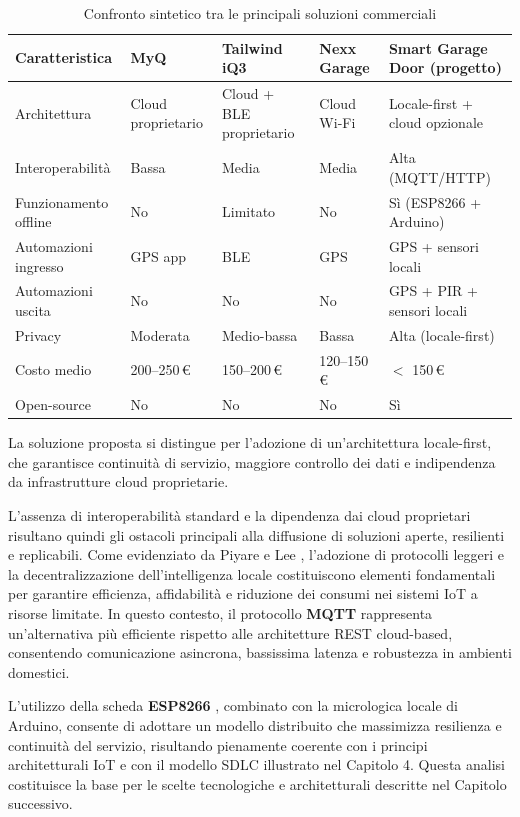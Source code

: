 \begin{table}[H]
\centering
\caption{Confronto sintetico tra le principali soluzioni commerciali}
\label{tab:competitors}
\begin{tabularx}{\textwidth}{@{}lXXXX@{}}
\toprule
\textbf{Caratteristica} & \textbf{MyQ} & \textbf{Tailwind iQ3} & \textbf{Nexx Garage} & \textbf{Smart Garage Door (progetto)} \\
\midrule
Architettura & Cloud proprietario & Cloud + BLE proprietario & Cloud Wi-Fi & Locale-first + cloud opzionale \\
Interoperabilità & Bassa & Media & Media & Alta (MQTT/HTTP) \\
Funzionamento offline & No & Limitato & No & Sì (ESP8266 + Arduino) \\
Automazioni ingresso & GPS app & BLE & GPS & GPS + sensori locali \\
Automazioni uscita & No & No & No & GPS + PIR + sensori locali \\
Privacy & Moderata & Medio-bassa & Bassa & Alta (locale-first) \\
Costo medio & 200–250\,€ & 150–200\,€ & 120–150\,€ & $<$ 150\,€ \\
Open-source & No & No & No & Sì \\
\bottomrule
\end{tabularx}
\end{table}

La soluzione proposta si distingue per l’adozione di un’architettura locale-first,
che garantisce continuità di servizio, maggiore controllo dei dati e indipendenza
da infrastrutture cloud proprietarie.

L’assenza di interoperabilità standard e la dipendenza dai cloud proprietari risultano quindi gli ostacoli principali alla diffusione di soluzioni aperte, resilienti e replicabili. Come evidenziato da Piyare e Lee \cite{Piyare2013}, l’adozione di protocolli leggeri e la decentralizzazione dell’intelligenza locale costituiscono elementi fondamentali per garantire efficienza, affidabilità e riduzione dei consumi nei sistemi IoT a risorse limitate. In questo contesto, il protocollo \textbf{MQTT} \cite{MQTTspec} rappresenta un’alternativa più efficiente rispetto alle architetture REST cloud-based, consentendo comunicazione asincrona, bassissima latenza e robustezza in ambienti domestici.

L’utilizzo della scheda \textbf{ESP8266} \cite{ESP8266}, combinato con la micrologica locale di Arduino, consente di adottare un modello distribuito che massimizza resilienza e continuità del servizio, risultando pienamente coerente con i principi architetturali IoT e con il modello SDLC illustrato nel Capitolo 4.
Questa analisi costituisce la base per le scelte tecnologiche e architetturali descritte nel Capitolo successivo.


